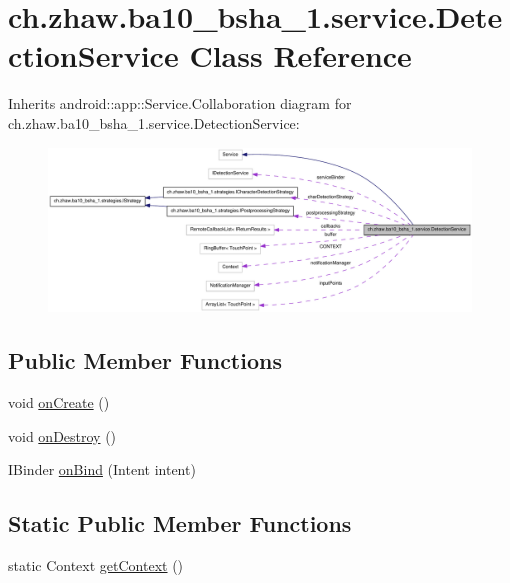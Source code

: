 \hypertarget{classch_1_1zhaw_1_1ba10__bsha__1_1_1service_1_1DetectionService}{
\section{ch.zhaw.ba10\_\-bsha\_\-1.service.DetectionService Class Reference}
\label{classch_1_1zhaw_1_1ba10__bsha__1_1_1service_1_1DetectionService}
}


Inherits android::app::Service.Collaboration diagram for ch.zhaw.ba10\_\-bsha\_\-1.service.DetectionService:\nopagebreak
\begin{figure}[H]
\begin{center}
\leavevmode
\includegraphics[width=400pt]{classch_1_1zhaw_1_1ba10__bsha__1_1_1service_1_1DetectionService__coll__graph}
\end{center}
\end{figure}
\subsection*{Public Member Functions}
\begin{DoxyCompactItemize}
\item 
void \hyperlink{classch_1_1zhaw_1_1ba10__bsha__1_1_1service_1_1DetectionService_a78b14ab8beb6bafa58ed1eb4c601d8a6}{onCreate} ()
\item 
void \hyperlink{classch_1_1zhaw_1_1ba10__bsha__1_1_1service_1_1DetectionService_ad432cd1189d8ccb72ad4a32b4cd7fd0a}{onDestroy} ()
\item 
IBinder \hyperlink{classch_1_1zhaw_1_1ba10__bsha__1_1_1service_1_1DetectionService_a4f03a6b3f16d1dfa20dafc02952681da}{onBind} (Intent intent)
\end{DoxyCompactItemize}
\subsection*{Static Public Member Functions}
\begin{DoxyCompactItemize}
\item 
static Context \hyperlink{classch_1_1zhaw_1_1ba10__bsha__1_1_1service_1_1DetectionService_a70a305c4eec817ca91cf711732f52e2a}{getContext} ()
\end{DoxyCompactItemize}
